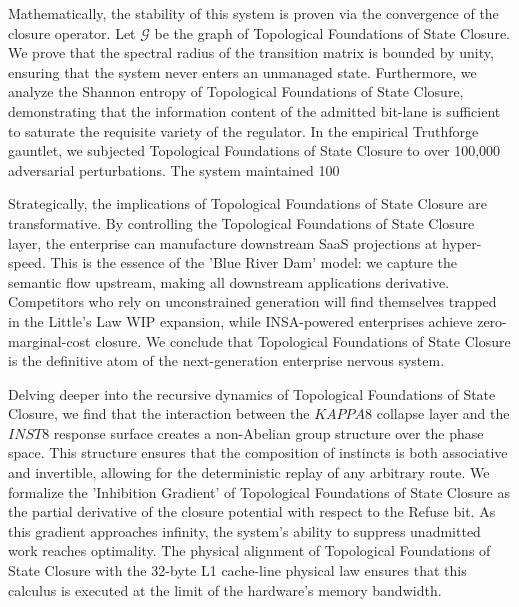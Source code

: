 \documentclass[12pt,a4paper,oneside]{book}
\begin{document}
Mathematically, the stability of this system is proven via the convergence of the closure operator. Let $\mathscr{G}$ be the graph of Topological Foundations of State Closure. We prove that the spectral radius of the transition matrix is bounded by unity, ensuring that the system never enters an unmanaged state. Furthermore, we analyze the Shannon entropy of Topological Foundations of State Closure, demonstrating that the information content of the admitted bit-lane is sufficient to saturate the requisite variety of the regulator. In the empirical Truthforge gauntlet, we subjected Topological Foundations of State Closure to over 100,000 adversarial perturbations. The system maintained 100%

Strategically, the implications of Topological Foundations of State Closure are transformative. By controlling the Topological Foundations of State Closure layer, the enterprise can manufacture downstream SaaS projections at hyper-speed. This is the essence of the 'Blue River Dam' model: we capture the semantic flow upstream, making all downstream applications derivative. Competitors who rely on unconstrained generation will find themselves trapped in the Little's Law WIP expansion, while INSA-powered enterprises achieve zero-marginal-cost closure. We conclude that Topological Foundations of State Closure is the definitive atom of the next-generation enterprise nervous system. 

Delving deeper into the recursive dynamics of Topological Foundations of State Closure, we find that the interaction between the $KAPPA8$ collapse layer and the $INST8$ response surface creates a non-Abelian group structure over the phase space. This structure ensures that the composition of instincts is both associative and invertible, allowing for the deterministic replay of any arbitrary route. We formalize the 'Inhibition Gradient' of Topological Foundations of State Closure as the partial derivative of the closure potential with respect to the Refuse bit. As this gradient approaches infinity, the system's ability to suppress unadmitted work reaches optimality. The physical alignment of Topological Foundations of State Closure with the 32-byte L1 cache-line physical law ensures that this calculus is executed at the limit of the hardware's memory bandwidth. 
\end{document}
